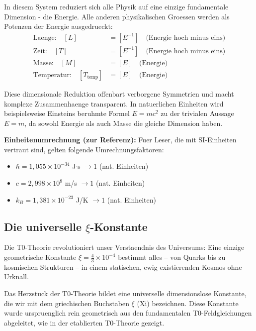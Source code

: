 \documentclass[12pt,a4paper]{article}
\begin{document}
	In diesem System reduziert sich alle Physik auf eine einzige fundamentale Dimension - die Energie. Alle anderen physikalischen Groessen werden als Potenzen der Energie ausgedrueckt:
	\begin{align}
		\text{Laenge:} \quad [L] &= [E^{-1}] \quad \text{(Energie hoch minus eins)} \\
		\text{Zeit:} \quad [T] &= [E^{-1}] \quad \text{(Energie hoch minus eins)} \\
		\text{Masse:} \quad [M] &= [E] \quad \text{(Energie)} \\
		\text{Temperatur:} \quad [T_{\text{temp}}] &= [E] \quad \text{(Energie)}
	\end{align}
	
	Diese dimensionale Reduktion offenbart verborgene Symmetrien und macht komplexe Zusammenhaenge transparent. In natuerlichen Einheiten wird beispielsweise Einsteins beruhmte Formel $E = mc^2$ zu der trivialen Aussage $E = m$, da sowohl Energie als auch Masse die gleiche Dimension haben.
	
	\textbf{Einheitenumrechnung (zur Referenz):}
	Fuer Leser, die mit SI-Einheiten vertraut sind, gelten folgende Umrechnungsfaktoren:
	\begin{itemize}
		\item $\hbar = 1{,}055 \times 10^{-34}$ J$\cdot$s $\rightarrow 1$ (nat. Einheiten)
		\item $c = 2{,}998 \times 10^8$ m/s $\rightarrow 1$ (nat. Einheiten)  
		\item $k_B = 1{,}381 \times 10^{-23}$ J/K $\rightarrow 1$ (nat. Einheiten)
	\end{itemize}
	
	\subsection{Die universelle $\xi$-Konstante}
	
	\begin{revolutionary}
		Die T0-Theorie revolutioniert unser Verstaendnis des Universums: Eine einzige geometrische Konstante $\xi = \frac{4}{3} \times 10^{-4}$ bestimmt alles -- von Quarks bis zu kosmischen Strukturen -- in einem statischen, ewig existierenden Kosmos ohne Urknall.
	\end{revolutionary}
	
	Das Herzstuck der T0-Theorie bildet eine universelle dimensionslose Konstante, die wir mit dem griechischen Buchstaben $\xi$ (Xi) bezeichnen. Diese Konstante wurde urspruenglich rein geometrisch aus den fundamentalen T0-Feldgleichungen abgeleitet, wie in der etablierten T0-Theorie \cite{T0Theory} gezeigt.
	
\end{document}
